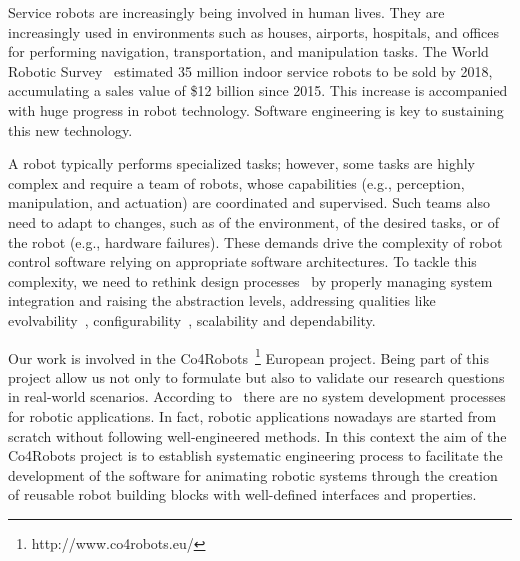Service robots are increasingly being involved in human lives. 
They are increasingly used in environments such as houses, airports, hospitals, and offices for performing navigation, transportation, and manipulation tasks. 
The World Robotic Survey~\cite{wrs:online} estimated 35 million indoor service robots to be sold by 2018, accumulating a sales value of \$12 billion since 2015. 
This increase is accompanied with huge progress in robot technology. %
Software engineering is key to sustaining this new technology.

A robot typically performs specialized tasks; however, some tasks are highly complex and require a team of robots, whose capabilities (e.g., perception, manipulation, and actuation) are coordinated and supervised. 
Such teams also need to adapt to changes, such as of the environment, of the desired tasks, or of the robot (e.g., hardware failures). 
These demands drive the complexity of robot control software relying on appropriate software architectures. 
To tackle this complexity, we need to rethink design processes~\cite{Lee2008} by properly managing system integration and raising the abstraction levels, addressing qualities like evolvability~\cite{Perez2008}, configurability~\cite{Gamez2013563}, scalability and dependability.

Our work is involved in the Co4Robots~\footnote{http://www.co4robots.eu/} European project.
Being part of this project allow us not only to formulate but also to validate our research questions in real-world scenarios.
According to~\cite{roadmap} there are no system development processes for robotic applications.
In fact, robotic applications nowadays are started from scratch without following well-engineered methods.
In this context the aim of the Co4Robots project is to establish systematic engineering process to facilitate the development of the software for animating robotic systems through the creation of reusable robot building blocks with well-defined interfaces and properties. 

